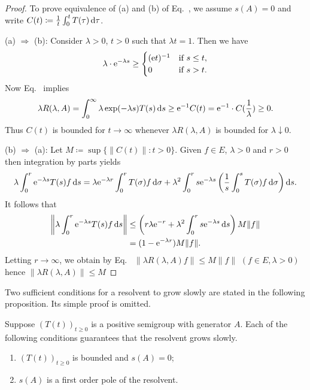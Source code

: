 \begin{proof} 
To prove equivalence of \upshape(a) and \upshape(b) of Eq.~, we assume $s(A) = 0$ and write $C(t) \coloneq \frac{1}{t} \int_{0}^{t} T(\tau) \mathop{}\!\mathrm{d}{\tau}$.

\upshape(a) $\Rightarrow$ \upshape(b): \quad 
Consider $\lambda > 0$, $t > 0$ such that $\lambda t = 1$. 
Then we have
\[
\lambda \cdot \eu^{-\lambda s} \geq 
\begin{cases}
	(\eu t)^{-1} & \text{if } s \leq t ,  \\
	0 & \text{if } s > t .
\end{cases}
\]
Now Eq.~ implies 
\[%
\lambda R(\lambda,A) = \int_{0}^{\infty} \lambda \exp(-\lambda s)T(s) \ds \geq \eu^{-1}C(t) = \eu^{-1}\cdot C(\frac{1}{\lambda}) \geq 0 .
\]
Thus $C(t)$ is bounded for $t \to \infty$ whenever $\lambda R(\lambda,A)$ is bounded for $\lambda \downarrow 0$.

\upshape(b) $\Rightarrow$ \upshape(a):\quad
 Let $M \coloneq \sup\{\|C(t)\| \colon t > 0\}$.
Given $f \in E$, $\lambda > 0$ and $r > 0$ then integration by parts yields
\[
	\lambda \int_{0}^{r} \mathrm{e}^{-\lambda s}T(s)f \mathop{}\!\mathrm{d}{s} = \lambda \mathrm{e}^{-\lambda r} \int_{0}^{r} T(\sigma)f \mathop{}\!\mathrm{d}{\sigma} + \lambda^{2}\int_{0}^{r} s\mathrm{e}^{-\lambda s}\left(\frac{1}{s}\int_{0}^{s} T(\sigma)f \mathop{}\!\mathrm{d}{\sigma}\right)\mathop{}\!\mathrm{d}{s} .
\]
It follows that
\begin{align*}
	\left\|\lambda \int_{0}^{r} \eu^{-\lambda s}T(s)f \ds\right\| &\leq \left(r\lambda \eu^{-r} + \lambda^{2}\int_{0}^{r} s\eu^{-\lambda s} \ds\right)M\|f\| \\
	&= (1 - \eu^{-\lambda r})M\|f\| .
\end{align*}
Letting $r \to \infty$, we obtain by Eq.~ $\|\lambda R(\lambda,A)f\| \leq M\|f\|$ $(f \in E, \lambda > 0)$ hence $\|\lambda R(\lambda,A)\| \leq M$
\end{proof}
Two sufficient conditions for a resolvent to grow slowly are stated in the following proposition.
Its simple proof is omitted.
\begin{proposition}\label{prop:c3-2.9}
	Suppose $(T(t))_{t\geq 0}$ is a positive semigroup with generator $A$.
	Each of the following conditions guarantees that the resolvent grows slowly.
	\begin{enumerate}[\upshape (i)]
		\item 
		$(T(t))_{t\geq 0}$ is bounded and $s(A) = 0$;
	
		\item 
		$s(A)$ is a first order pole of the resolvent.
	\end{enumerate}
\end{proposition}
